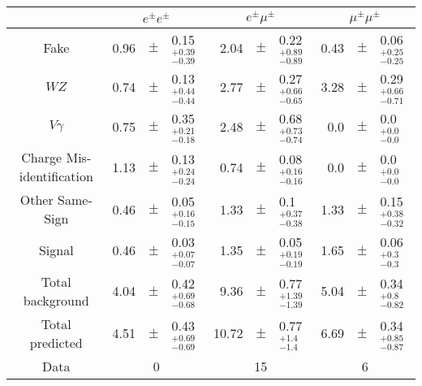 \renewcommand{\tabcolsep}{2pt}
\begin{tabular}{c|rclrclrcl}
\hline 
\hline 
 & \multicolumn{3}{c}{$e^\pm e^\pm$} & \multicolumn{3}{c}{$e^\pm \mu^\pm$} & \multicolumn{3}{c}{$\mu^\pm \mu^\pm$}\\ 
 \hline
Fake & 0.96 &$\pm$& 0.15 $^{+0.39}_{-0.39}$  & 2.04 &$\pm$& 0.22 $^{+0.89}_{-0.89}$  & 0.43 &$\pm$& 0.06 $^{+0.25}_{-0.25}$ \\[0.2cm] 
$WZ$ & 0.74 &$\pm$& 0.13 $^{+0.44}_{-0.44}$  & 2.77 &$\pm$& 0.27 $^{+0.66}_{-0.65}$  & 3.28 &$\pm$& 0.29 $^{+0.66}_{-0.71}$ \\[0.2cm] 
$V\gamma$ & 0.75 &$\pm$& 0.35 $^{+0.21}_{-0.18}$  & 2.48 &$\pm$& 0.68 $^{+0.73}_{-0.74}$  & 0.0 &$\pm$& 0.0 $^{+0.0}_{-0.0}$ \\[0.2cm] 
Charge Mis-identification & 1.13 &$\pm$& 0.13 $^{+0.24}_{-0.24}$  & 0.74 &$\pm$& 0.08 $^{+0.16}_{-0.16}$  & 0.0 &$\pm$& 0.0 $^{+0.0}_{-0.0}$ \\[0.2cm] 
Other Same-Sign & 0.46 &$\pm$& 0.05 $^{+0.16}_{-0.15}$  & 1.33 &$\pm$& 0.1 $^{+0.37}_{-0.38}$  & 1.33 &$\pm$& 0.15 $^{+0.38}_{-0.32}$ \\[0.2cm] 
Signal & 0.46 &$\pm$& 0.03 $^{+0.07}_{-0.07}$  & 1.35 &$\pm$& 0.05 $^{+0.19}_{-0.19}$  & 1.65 &$\pm$& 0.06 $^{+0.3}_{-0.3}$ \\[0.2cm] 
\hline 
Total background  & 4.04 &$\pm$& 0.42 $^{+0.69}_{-0.68}$  & 9.36 &$\pm$& 0.77 $^{+1.39}_{-1.39}$  & 5.04 &$\pm$& 0.34 $^{+0.8}_{-0.82}$ \\[0.2cm] 
Total predicted & 4.51 &$\pm$& 0.43 $^{+0.69}_{-0.69}$  & 10.72 &$\pm$& 0.77 $^{+1.4}_{-1.4}$  & 6.69 &$\pm$& 0.34 $^{+0.85}_{-0.87}$ \\ \hline 
Data & \multicolumn{3}{c}{0} & \multicolumn{3}{c}{15} & \multicolumn{3}{c}{6}\\ 
\hline 
\end{tabular}


